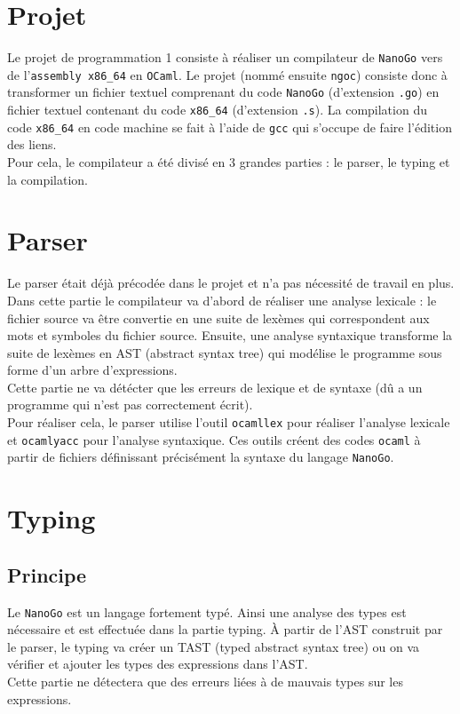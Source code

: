 \documentclass[10pt]{report}
\title{}
\author{}
\date{\today}
\begin{document}
\section{Projet}
Le projet de programmation 1 consiste à réaliser un compilateur de \verb|NanoGo| vers de l'\verb|assembly x86_64| en \verb|OCaml|. Le projet (nommé ensuite \verb|ngoc|) consiste donc à transformer un fichier textuel comprenant du code \verb|NanoGo| (d'extension \verb|.go|) en fichier textuel contenant du code \verb|x86_64| (d'extension \verb|.s|). La compilation du code \verb|x86_64| en code machine se fait à l'aide de \verb|gcc| qui s'occupe de faire l'édition des liens. \\
\indent Pour cela, le compilateur a été divisé en 3 grandes parties : le parser, le typing et la compilation.

\section{Parser}
Le parser était déjà précodée dans le projet et n'a pas nécessité de travail en plus. Dans cette partie le compilateur va d'abord de réaliser une analyse lexicale : le fichier source va être convertie en une suite de lexèmes qui correspondent aux mots et symboles du fichier source. Ensuite, une analyse syntaxique transforme la suite de lexèmes en AST (abstract syntax tree) qui modélise le programme sous forme d'un arbre d'expressions. \\
\indent Cette partie ne va détécter que les erreurs de lexique et de syntaxe (dû a un programme qui n'est pas correctement écrit). \\
\indent Pour réaliser cela, le parser utilise l'outil \verb|ocamllex| pour réaliser l'analyse lexicale et \verb|ocamlyacc| pour l'analyse syntaxique. Ces outils créent des codes \verb|ocaml| à partir de fichiers définissant précisément la syntaxe du langage \verb|NanoGo|.

\section{Typing}

\subsection{Principe}

Le \verb|NanoGo| est un langage fortement typé. Ainsi une analyse des types est nécessaire et est effectuée dans la partie typing. À partir de l'AST construit par le parser, le typing va créer un TAST (typed abstract syntax tree) ou on va vérifier et ajouter les types des expressions dans l'AST. \\
\indent Cette partie ne détectera que des erreurs liées à de mauvais types sur les expressions.
\end{document}
